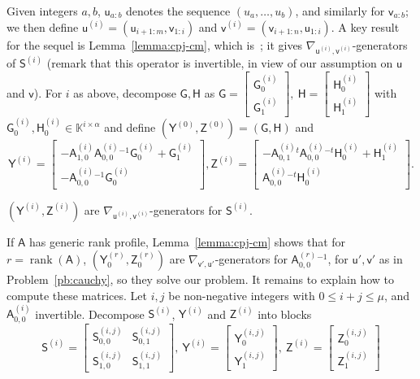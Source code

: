 \documentclass[sigconf]{acmart}
\newcommand{\vu}{\ensuremath{\mathsf{u}}}
\newcommand{\vv}{\ensuremath{\mathsf{v}}}
\newcommand{\mA}{\ensuremath{\mathsf{A}}}
\newcommand{\mG}{\ensuremath{\mathsf{G}}}
\newcommand{\mH}{\ensuremath{\mathsf{H}}}
\newcommand{\mS}{\ensuremath{\mathsf{S}}}
\newcommand{\mY}{\ensuremath{\mathsf{Y}}}
\newcommand{\mZ}{\ensuremath{\mathsf{Z}}}
\newcommand{\K}{\ensuremath{\mathbb{K}}}
\newcommand{\mn}{\ensuremath{\mu}}
\newcommand{\rank}{\ensuremath{\operatorname{rank}}}
\theoremstyle{acmdefinition}
\begin{document}
Given integers $a,b$, $\vu_{a:b}$ denotes the sequence
$(u_a,\dots,u_b)$, and similarly for $\vv_{a:b}$; we then define
$\vu^{(i)}=(\vu_{i+1:m},\vv_{1:i})$ and
$\vv^{(i)}=(\vv_{i+1:n},\vu_{1:i})$.
A key result for the sequel is Lemma~\ref{lemma:cpj-cm}, which
is~\cite[Proposition~1]{Cardinal99}; it gives 
$\nabla_{\vu^{(i)},\vv^{(i)}}$-generators of $\mS^{(i)}$ (remark that
this operator is invertible, in view of our assumption on $\vu$ and
$\vv$).  For $i$ as above, decompose $\mG,\mH$ as
$
\mG=\left [\begin{smallmatrix} 
   \mG^{(i)}_0 \\ \mG^{(i)}_1
\end{smallmatrix}\right ],\ 
  \mH=
\left [\begin{smallmatrix}
        \mH^{(i)}_0 \\    \mH^{(i)}_1 
\end{smallmatrix}\right ]
$
with $\mG^{(i)}_0, \mH^{(i)}_0 \in \K^{i \times \alpha}$ and define
$(\mY^{(0)},\mZ^{(0)})=(\mG,\mH)$ and 
\[
\!\!\mY^{(i)}\!=\! 
\begin{bmatrix}
-\mA^{(i)}_{1,0}{\mA^{(i)}_{0,0}}{}^{-1}\mG^{(i)}_0 + \mG^{(i)}_1 \\
-{\mA^{(i)}_{0,0}}{}^{-1} \mG^{(i)}_0 
\end{bmatrix}\!,
\mZ^{(i)}\!=\! 
\begin{bmatrix}
-{\mA^{(i)}_{0,1}}{}^t{\mA^{(i)}_{0,0}}{}^{-t}\mH^{(i)}_0 + \mH^{(i)}_1 \\
{\mA^{(i)}_{0,0}}{}^{-t} \mH^{(i)}_0 
\end{bmatrix}.
\]
\begin{lemma}\label{lemma:cpj-cm}
 $(\mY^{(i)},\mZ^{(i)})$ are $\nabla_{\vu^{(i)},\vv^{(i)}}$-generators for $\mS^{(i)}$.
\end{lemma}
If $\mA$ has generic rank profile, Lemma~\ref{lemma:cpj-cm} shows
that for $r=\rank(\mA)$, $(\mY^{(r)}_0,\mZ^{(r)}_0)$ are
$\nabla_{\vv',\vu'}$-generators for ${\mA^{(r)}_{0,0}}{}^{-1}$, for
$\vu',\vv'$ as in Problem~\ref{pb:cauchy}, so they solve our problem.
It remains to explain how to compute these matrices.
%
Let $i,j$ be non-negative integers with $0 \le i+j \le \mn$, and
${\mA^{(i)}_{0,0}}$ invertible. Decompose $\mS^{(i)}$, $\mY^{(i)}$ and
$\mZ^{(i)}$ into blocks
\begin{equation*}
\mS^{(i)} = \begin{bmatrix} 
\mS^{(i,j)}_{0,0} & \mS^{(i,j)}_{0,1} \\
\mS^{(i,j)}_{1,0} & \mS^{(i,j)}_{1,1}
\end{bmatrix},\  
\mY^{(i)} = 
\begin{bmatrix}
  \mY^{(i,j)}_0 \\\mY^{(i,j)}_1
\end{bmatrix},\ 
\mZ^{(i)} = 
\begin{bmatrix}
  \mZ^{(i,j)}_0 \\\mZ^{(i,j)}_1
\end{bmatrix}
\end{equation*}
\end{document}
